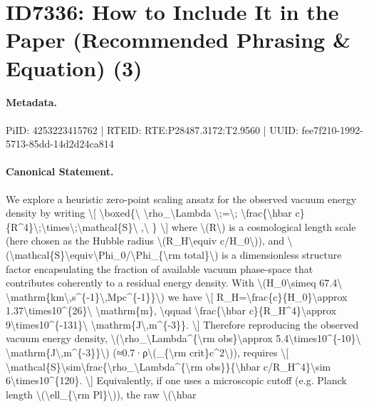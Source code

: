 \section*{ID7336: How to Include It in the Paper (Recommended Phrasing \& Equation) (3)}
\paragraph{Metadata.}
PiID: 4253223415762 | RTEID: RTE:P28487.3172:T2.9560 | UUID: fee7f210-1992-5713-85dd-14d2d24ca814

\paragraph{Canonical Statement.}
We explore a heuristic zero-point scaling ansatz for the observed vacuum energy density by writing \textbackslash{}[ \textbackslash{}boxed\{\textbackslash{} \textbackslash{}rho\_\textbackslash{}Lambda \textbackslash{};=\textbackslash{}; \textbackslash{}frac\{\textbackslash{}hbar c\}\{R\textasciicircum{}4\}\textbackslash{};\textbackslash{}times\textbackslash{};\textbackslash{}mathcal\{S\}\textbackslash{} ,\textbackslash{} \} \textbackslash{}] where \textbackslash{}(R\textbackslash{}) is a cosmological length scale (here chosen as the Hubble radius \textbackslash{}(R\_H\textbackslash{}equiv c/H\_0\textbackslash{})), and \textbackslash{}(\textbackslash{}mathcal\{S\}\textbackslash{}equiv\textbackslash{}Phi\_0/\textbackslash{}Phi\_\{\textbackslash{}rm total\}\textbackslash{}) is a dimensionless structure factor encapsulating the fraction of available vacuum phase-space that contributes coherently to a residual energy density. With \textbackslash{}(H\_0\textbackslash{}simeq 67.4\textbackslash{} \textbackslash{}mathrm\{km\textbackslash{},s\textasciicircum{}\{-1\}\textbackslash{},Mpc\textasciicircum{}\{-1\}\}\textbackslash{}) we have \textbackslash{}[ R\_H=\textbackslash{}frac\{c\}\{H\_0\}\textbackslash{}approx 1.37\textbackslash{}times10\textasciicircum{}\{26\}\textbackslash{} \textbackslash{}mathrm\{m\}, \textbackslash{}qquad \textbackslash{}frac\{\textbackslash{}hbar c\}\{R\_H\textasciicircum{}4\}\textbackslash{}approx 9\textbackslash{}times10\textasciicircum{}\{-131\}\textbackslash{} \textbackslash{}mathrm\{J\textbackslash{},m\textasciicircum{}\{-3\}\}. \textbackslash{}] Therefore reproducing the observed vacuum energy density, \textbackslash{}(\textbackslash{}rho\_\textbackslash{}Lambda\textasciicircum{}\{\textbackslash{}rm obs\}\textbackslash{}approx 5.4\textbackslash{}times10\textasciicircum{}\{-10\}\textbackslash{} \textbackslash{}mathrm\{J\textbackslash{},m\textasciicircum{}\{-3\}\}\textbackslash{}) (≈0.7·ρ\textbackslash{}(\_\{\textbackslash{}rm crit\}c\textasciicircum{}2\textbackslash{})), requires \textbackslash{}[ \textbackslash{}mathcal\{S\}\textbackslash{}sim\textbackslash{}frac\{\textbackslash{}rho\_\textbackslash{}Lambda\textasciicircum{}\{\textbackslash{}rm obs\}\}\{\textbackslash{}hbar c/R\_H\textasciicircum{}4\}\textbackslash{}sim 6\textbackslash{}times10\textasciicircum{}\{120\}. \textbackslash{}] Equivalently, if one uses a microscopic cutoff (e.g. Planck length \textbackslash{}(\textbackslash{}ell\_\{\textbackslash{}rm Pl\}\textbackslash{})), the raw \textbackslash{}(\textbackslash{}hbar 